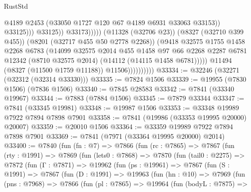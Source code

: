 \begin{lexlean}{RustStd}
\begin{coremodule}
{\begin{coremodule}
{{{{{{{{{{{{{{{{{{{{{{{{{{{{{{{{{{{{{{{{{{{{{{{{{{{{{{                                                @4189
                                                @2453
                                                (@33050 @1727 @120 @67 @4189 @6931 @33063 @33153))
                                              @33125)))
                                        @33125))
                                    @33173)))))
                          (@11328 (@32706 @23))
                          (@8327 (@32710 @399 @455))
                          (@8201 (@32717 @455 @50 @2778 @2268))
                          (@9418
                            @32575
                            @1755
                            @1458
                            @2268
                            @6783
                            (@14099
                              @32575
                              @2014
                              @455
                              @1458
                              @97
                              @66
                              @2268
                              @2287
                              @6781
                              @12342
                              (@8710 @32575 @2014)
                              (@14112 (@14115 @1458 @6781)))))
                        @11494
                        (@8327 (@11500 @1759 @11188))
                        @11506))))))))))
@33334 := @32246 (@32271 (@32312 (@32314 @33330)))
@33335 := @7824 @1506
@33339 := @19955 (@7830 @1506) (@7836 @1506)
@33340 := @7845 @28583
@33342 := @7841 (@33340 @19967)
@33344 := @7883 (@7884 @1506)
@33345 := @7879 @33344
@33347 := @7841 (@33345 @19981)
@33348 := @19987 @1506
@33353 := @33348 @19989 @7922 @7894 @7898 @7901
@33358 := @7841 (@19986 (@33353 @19995 @20000) @20007)
@33359 := @20010 @1506
@33364 := @33359 @19989 @7922 @7894 @7898 @7901
@33369 := @7841 (@7971 (@33364 @19995 @20000) @2014)
@33400 := @7840
    (fun (fn : @7) =>
    @7866
      (fun (rc : @7865) =>
      @7867
        (fun (rty : @1991) =>
        @7869
          (fun (lets0 : @7868) =>
          @7870
            (fun (tail0 : @2275) =>
            @7872
              (fun (Γ : @7871) =>
              @19962
                (fun (ps : @19961) =>
                @7867
                  (fun (S : @1991) =>
                  @7867
                    (fun (D : @1991) =>
                    @19963
                      (fun (hn : @10) =>
                      @7969
                        (fun (pns : @7968) =>
                        @7866
                          (fun (pl : @7865) =>
                          @19964
                            (fun (bodyL : @7875) =>
}}}}}}}}}}}}}}}}}}}}}}}}}}}}}}}}}}}}}}}}}}}}}}}}}}}}}}
\end{coremodule}}
\end{coremodule}
\end{lexlean}
